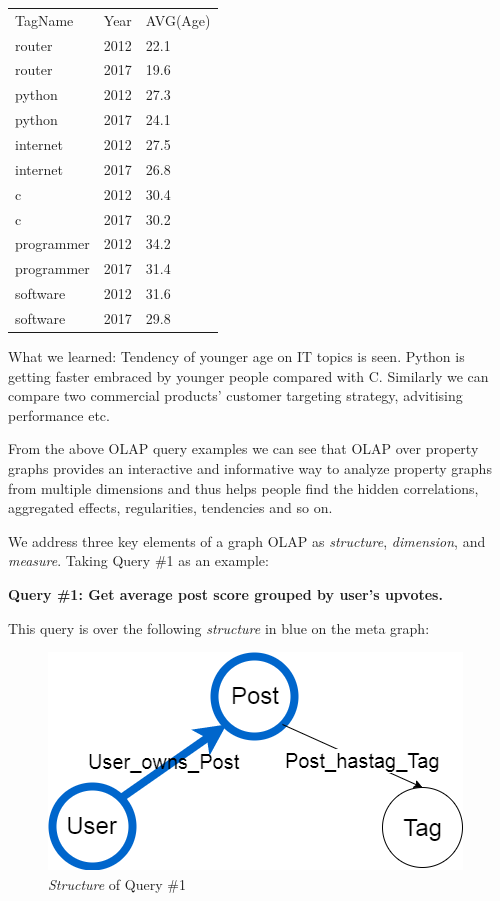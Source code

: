 \begin {center}
\begin{tabular}{ l l  l}
	
	TagName&Year&AVG(Age)\\router&2012&22.1\\router&2017&19.6\\python&2012&27.3\\python&2017&24.1\\internet&2012&27.5\\internet&2017&26.8\\c&2012&30.4\\c&2017&30.2\\programmer&2012&34.2\\programmer&2017&31.4\\software&2012&31.6\\software&2017&29.8\\
	
\end{tabular}
\end {center}

What we learned:	Tendency of younger age on IT topics is seen. 
Python is getting faster embraced by younger people compared with C. Similarly we can compare two commercial products’ customer targeting strategy, advitising performance etc. 

From the above OLAP query examples we can see that OLAP over property graphs provides an interactive and informative way to analyze property graphs from multiple dimensions and thus helps people find the hidden correlations, aggregated effects, regularities, tendencies and so on.  




 We address three key elements of a graph OLAP as \textit{structure}, \textit{dimension}, and \textit{measure}. Taking Query \#1 as an example: 

\textbf{Query \#1: 		Get average post score grouped by user’s upvotes. }
 
This query is over the following \textit{structure} in blue on the meta graph:

\begin {figure}[H]
\centering
\includegraphics[scale=0.5]{pic/meta1.png}
\caption{\textit{Structure} of Query \#1}
\end{figure}



